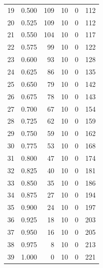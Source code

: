 \documentclass[a4paper,twoside,12pt]{book}
\begin{document}
\begin{appendices}
\begin{table}
\begin{tabular}{lrrrrr}
		19 &  0.500 &       109 &        10 &               0 &             112 \\
		20 &  0.525 &       109 &        10 &               0 &             112 \\
		21 &  0.550 &       104 &        10 &               0 &             117 \\
		22 &  0.575 &        99 &        10 &               0 &             122 \\
		23 &  0.600 &        93 &        10 &               0 &             128 \\
		24 &  0.625 &        86 &        10 &               0 &             135 \\
		25 &  0.650 &        79 &        10 &               0 &             142 \\
		26 &  0.675 &        78 &        10 &               0 &             143 \\
		27 &  0.700 &        67 &        10 &               0 &             154 \\
		28 &  0.725 &        62 &        10 &               0 &             159 \\
		29 &  0.750 &        59 &        10 &               0 &             162 \\
		30 &  0.775 &        53 &        10 &               0 &             168 \\
		31 &  0.800 &        47 &        10 &               0 &             174 \\
		32 &  0.825 &        40 &        10 &               0 &             181 \\
		33 &  0.850 &        35 &        10 &               0 &             186 \\
		34 &  0.875 &        27 &        10 &               0 &             194 \\
		35 &  0.900 &        24 &        10 &               0 &             197 \\
		36 &  0.925 &        18 &        10 &               0 &             203 \\
		37 &  0.950 &        16 &        10 &               0 &             205 \\
		38 &  0.975 &         8 &        10 &               0 &             213 \\
		39 &  1.000 &         0 &        10 &               0 &             221 \\
		\bottomrule
	\end{tabular}
\end{table} 


\end{appendices}
\end{document}
